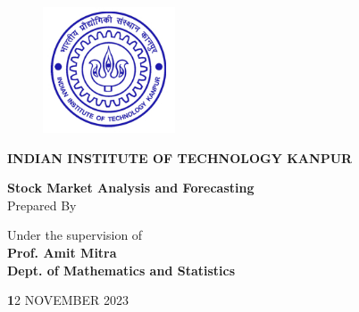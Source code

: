 \documentclass{article}
\date{}
\begin{document}
\thispagestyle{empty}
        \begin{figure}[h]
            \centering
            \includegraphics[width=0.35\textwidth]{iitk_logo.jpg}
        \end{figure}

	\begin{center}
	\vspace{0.25cm}
	\LARGE
	\textbf{INDIAN INSTITUTE OF TECHNOLOGY KANPUR}
 
	\vspace{2.1cm}	
	\Large
\textbf{\huge Stock Market Analysis and Forecasting}
	\vspace{1.5cm}
	\normalsize	
	\\ \large Prepared By \\
	\vspace{.2cm}
	\begin{table}[h]
            \centering
        \end{table}

	
	\vspace{1.3cm}
	\normalsize	
	   \large Under the supervision of  \\
	\vspace{.2cm}
	\large
	\textbf{\Large Prof. Amit Mitra \\ Dept. of Mathematics and Statistics } 	
 
	\vspace{3.5cm}
	\date{ 12 NOVEMBER 2023}
        {\textbf12 NOVEMBER 2023}
	\end{center}
	
\end{document}
